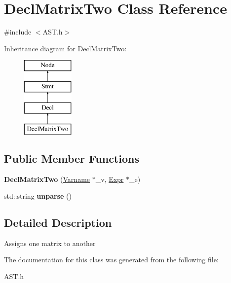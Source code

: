 \hypertarget{classDeclMatrixTwo}{\section{Decl\-Matrix\-Two Class Reference}
\label{classDeclMatrixTwo}
}


{\ttfamily \#include $<$A\-S\-T.\-h$>$}

Inheritance diagram for Decl\-Matrix\-Two\-:\begin{figure}[H]
\begin{center}
\leavevmode
\includegraphics[height=4.000000cm]{classDeclMatrixTwo}
\end{center}
\end{figure}
\subsection*{Public Member Functions}
\begin{DoxyCompactItemize}
\item 
\hypertarget{classDeclMatrixTwo_aef678c4989609d3d780d5c1f71924f0e}{{\bfseries Decl\-Matrix\-Two} (\hyperlink{classVarname}{Varname} $\ast$\-\_\-v, \hyperlink{classExpr}{Expr} $\ast$\-\_\-e)}\label{classDeclMatrixTwo_aef678c4989609d3d780d5c1f71924f0e}

\item 
\hypertarget{classDeclMatrixTwo_af5cb097943bbcb9458704f296d56cc24}{std\-::string {\bfseries unparse} ()}\label{classDeclMatrixTwo_af5cb097943bbcb9458704f296d56cc24}

\end{DoxyCompactItemize}


\subsection{Detailed Description}
Assigns one matrix to another 

The documentation for this class was generated from the following file\-:\begin{DoxyCompactItemize}
\item 
A\-S\-T.\-h\end{DoxyCompactItemize}
